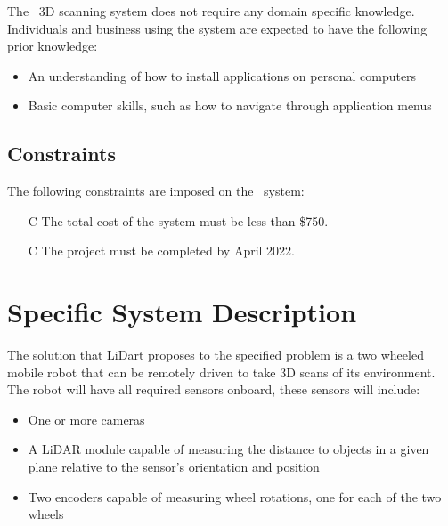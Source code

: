 \documentclass[12pt]{article}
\newcounter{constnum} %
\begin{document}
The \progname\ 3D scanning system does not require any domain specific knowledge. Individuals and business using the system are expected to have the following prior knowledge:   
  
\begin{itemize}
\item An understanding of how to install applications on personal computers
\item Basic computer skills, such as how to navigate through application menus
\end{itemize}

\subsection{Constraints}


The following constraints are imposed on the \progname\ system:
\noindent \begin{itemize}
\item[C\refstepcounter{constnum}\theconstnum] The total cost of the system must be less than \$750.
\item[C\refstepcounter{constnum}\theconstnum] The project must be completed by April 2022.
\end{itemize}

\section{Specific System Description} 
\label{sec_SpecificDesc}

The solution that LiDart proposes to the specified problem is a two wheeled
mobile robot that can be remotely driven to take 3D scans of its environment.
The robot will have all required sensors onboard, these sensors will include:

\begin{itemize}
\item One or more cameras
\item A LiDAR module capable of measuring the distance to objects in a given plane relative to the sensor's orientation and position
\item Two encoders capable of measuring wheel rotations, one for each of the two wheels
\end{itemize}
\end{document}

